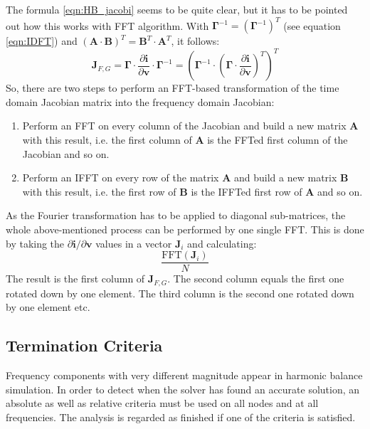 The formula \ref{eqn:HB_jacobi} seems to be quite clear, but it has to be pointed out how
this works with FFT algorithm. With
$\boldsymbol{\Gamma}^{-1} = (\boldsymbol{\Gamma}^{-1})^T$
(see equation \ref{eqn:IDFT}) and
$(\boldsymbol{A}\cdot\boldsymbol{B})^T = \boldsymbol{B}^T\cdot \boldsymbol{A}^T$,
it follows:
\begin{equation}
\boldsymbol{J}_{F,G}
  = \boldsymbol{\Gamma}\cdot\frac{\partial\boldsymbol{i}}{\partial\boldsymbol{v}}
    \cdot\boldsymbol{\Gamma}^{-1}
  = \left( \boldsymbol{\Gamma}^{-1}\cdot \left( \boldsymbol{\Gamma} \cdot
    \frac{\partial\boldsymbol{i}}{\partial\boldsymbol{v}} \right)^T \right)^T
\end{equation}
So, there are two steps to perform an FFT-based transformation of the time
domain Jacobian matrix into the frequency domain Jacobian:
\begin{enumerate}
\item Perform an FFT on every column of the Jacobian and build a new matrix
      $\boldsymbol{A}$ with this result, i.e. the first column of
      $\boldsymbol{A}$ is the FFTed first column of the Jacobian and so on.
\item Perform an IFFT on every row of the matrix $\boldsymbol{A}$ and build
      a new matrix $\boldsymbol{B}$ with this result, i.e. the first row of
      $\boldsymbol{B}$ is the IFFTed first row of $\boldsymbol{A}$ and so on.
\end{enumerate}
As the Fourier transformation has to be applied to diagonal sub-matrices,
the whole above-mentioned process can be performed by one single FFT. This
is done by taking the $\partial\boldsymbol{i} / \partial\boldsymbol{v}$
values in a vector $\boldsymbol{J}_i$ and calculating:
\begin{equation}
\dfrac{\text{FFT}(\boldsymbol{J}_i)}{N}
\end{equation}
The result is the first column of $\boldsymbol{J}_{F,G}$. The second column
equals the first one rotated down by one element. The third column is the
second one rotated down by one element etc.


\subsection{Termination Criteria}

Frequency components with very different magnitude appear in harmonic
balance simulation. In order to detect when the solver has found an
accurate solution, an absolute as well as relative criteria must be
used on all nodes and at all frequencies. The analysis is regarded as
finished if one of the criteria is satisfied.

